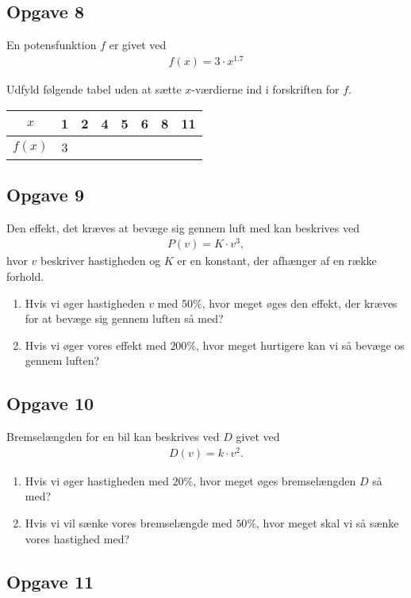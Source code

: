 \subsection*{Opgave 8}
En potensfunktion $f$ er givet ved
\begin{align*}
	f(x) = 3 \cdot x^{1.7}
\end{align*}

Udfyld følgende tabel uden at sætte $x$-værdierne ind i forskriften for $f$.
\begin{center}
	\begin{tabular}{c|c|c|c|c|c|c|c}
		$x$ & 1 & 2 & 4 & 5 & 6 & 8 & 11 \\ \hline
		$f(x)$ & 3 & & & & & &
	\end{tabular}
\end{center}

\subsection*{Opgave 9}
Den effekt, det kræves at bevæge sig gennem luft med kan beskrives ved 
\begin{align*}
P(v) = K\cdot v^3,
\end{align*}
hvor $v$ beskriver hastigheden og $K$ er en konstant, der afhænger af en række forhold.
\begin{enumerate}[label=\roman*)]
\item Hvis vi øger hastigheden $v$ med $50\%$, hvor meget øges den effekt, der kræves for at bevæge sig gennem luften så med? 
\item Hvis vi øger vores effekt med $200\%$, hvor meget hurtigere kan vi så bevæge os gennem luften?
\end{enumerate}
\subsection*{Opgave 10}
Bremselængden for en bil kan beskrives ved $D$ givet ved
\begin{align*}
D(v) = k\cdot v^2.
\end{align*}
\begin{enumerate}[label=\roman*)]
\item Hvis vi øger hastigheden med $20\%$, hvor meget øges bremselængden $D$ så med?
\item Hvis vi vil sænke vores bremselængde med $50\%$, hvor meget skal vi så sænke vores hastighed med?
\end{enumerate}

\subsection*{Opgave 11}



